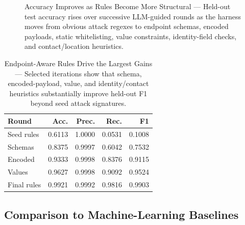 \documentclass[letterpaper,twocolumn,10pt]{article}
\begin{document}
\begin{figure}[t]
\centering
{}
\caption{Accuracy Improves as Rules Become More Structural --- Held-out test accuracy rises over successive LLM-guided rounds as the harness moves from obvious attack regexes to endpoint schemas, encoded payloads, static whitelisting, value constraints, identity-field checks, and contact/location heuristics.}
\label{fig:accuracy-by-round}
\end{figure}

\begin{table}[t]
\centering
\small
\begin{tabular}{lrrrr}
\toprule
Round & Acc. & Prec. & Rec. & F1 \\
\midrule
Seed rules & 0.6113 & 1.0000 & 0.0531 & 0.1008 \\
Schemas & 0.8375 & 0.9997 & 0.6042 & 0.7532 \\
Encoded & 0.9333 & 0.9998 & 0.8376 & 0.9115 \\
Values & 0.9627 & 0.9998 & 0.9092 & 0.9524 \\
Final rules & 0.9921 & 0.9992 & 0.9816 & 0.9903 \\
\bottomrule
\end{tabular}
\caption{Endpoint-Aware Rules Drive the Largest Gains --- Selected iterations show that schema, encoded-payload, value, and identity/contact heuristics substantially improve held-out F1 beyond seed attack signatures.}
\label{tab:rule-iterations}
\end{table}

\subsection{Comparison to Machine-Learning Baselines}
\end{document}

